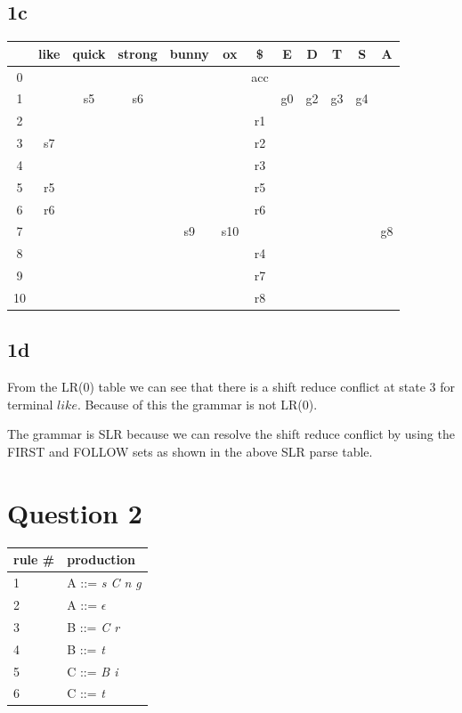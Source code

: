 \documentclass{article}
\begin{document}
    \subsection*{1c}
    \begin{center}
        \begin{tabular}{ c c c c c c c | c c c c c }
            \hline
            & like & quick & strong & bunny & ox & \$ & E & D & T & S & A \\
            \hline
            0 & & & & & & acc & \\
            1 & & s5 & s6 & & & & g0 & g2 & g3 & g4 & \\
            2 & & & & & & r1 & \\
            3 & s7 & & & & & r2 & \\
            4 & & & & & & r3 & \\
            5 & r5 & & & & & r5 & \\
            6 & r6 & & & & & r6 & \\
            7 & & & & s9 & s10 & & & & & & g8 \\
            8 & & & & & & r4 & \\
            9 & & & & & & r7 & \\
            10 & & & & & & r8 & \\
        \end{tabular}
    \end{center}

    \subsection*{1d}
    From the LR(0) table we can see that there is a shift reduce conflict at state 3 for terminal $like$. Because of this the grammar is not LR(0).

    The grammar is SLR because we can resolve the shift reduce conflict by using the FIRST and FOLLOW sets as shown in the above SLR parse table.
    
    \section*{Question 2}
    \begin{center}
        \begin{tabular}{ l l }
        \hline
        rule \# & production \\
        \hline
        1   &   A   ::= \textit{s C n g} \\
        2   &   A   ::= $\epsilon$ \\
        3   &   B   ::= \textit{C r} \\
        4   &   B   ::= \textit{t} \\
        5   &   C   ::= \textit{B i} \\
        6   &   C   ::= \textit{t} \\
        \end{tabular}
    \end{center}
\end{document}
